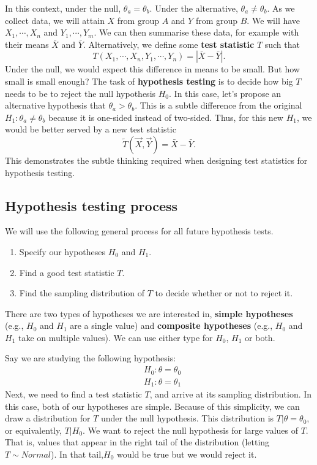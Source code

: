 \documentclass[titlepage, 12pt, leqno]{article}
\begin{document}
In this context, under the null, $\theta_{a} = \theta_{b}$. Under the alternative,
$\theta_{a} \ne \theta_{b}$. As we collect data, we will attain $X$ from group
$A$ and $Y$ from group $B$. We will have $X_{1}, \cdots , X_{n}$ and
$Y_{1}, \cdots , Y_{m}$. We can then summarise these data, for example with
their means $\bar X$ and $\bar Y$. Alternatively, we define some \textbf{test
statistic} $T$ such that
\[
T(X_{1}, \cdots , X_{n}, Y_{1}, \cdots ,Y_{n}) = |\bar X - \bar Y|.
\]
Under the null, we would expect this difference in means to be small. But how
small is small enough? The task of \textbf{hypothesis testing} is to decide
how big $T$ needs to be to reject the null hypothesis $H_{0}$. In this case,
let's propose an alternative hypothesis that $\theta_{a} > \theta_{b}$. This is
a subtle difference from the original $H_{1} : \theta_{a} \ne \theta_{b}$ 
because it is one-sided instead of two-sided. Thus, for this new $H_{1}$, we
would be better served by a new test statistic
\[
\tilde{T}(\vec X, \vec Y) = \bar X - \bar Y.
\]
This demonstrates the subtle thinking required when designing test statistics
for hypothesis testing.

\subsection{Hypothesis testing process}
We will use the following general process for all future hypothesis tests.
\begin{enumerate}
    \item Specify our hypotheses $H_{0}$ and $H_{1}$.
    \item Find a good test statistic $T$.
    \item Find the sampling distribution of $T$ to decide whether or not to
        reject it.
\end{enumerate}

\begin{definition}
    There are two types of hypotheses we are interested in, \textbf{simple
    hypotheses} (e.g., $H_{0}$ and $H_{1}$ are a single value) and 
    \textbf{composite hypotheses} (e.g., $H_{0}$ and $H_{1}$ take on multiple
    values). We can use either type for $H_{0}$, $H_{1}$ or both.
\end{definition}

Say we are studying the following hypothesis:
\begin{align*}
    &H_{0} : \theta = \theta_{0}\\
    &H_{1} : \theta = \theta_{1}
\end{align*}
Next, we need to find a test statistic $T$, and arrive at its sampling
distribution. In this case, both of our hypotheses are simple. Because of this
simplicity, we can draw a distribution for $T$ under the null hypothesis. This
distribution is $T|\theta = \theta_{0}$, or equivalently, $T|H_{0}$. We want
to reject the null hypothesis for large values of $T$. That is, values that
appear in the right tail of the distribution (letting $T \sim Normal$). In that
tail,$H_{0}$ would be true but we would reject it.
\end{document}

